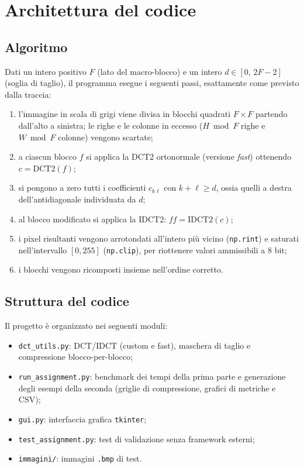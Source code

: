 \documentclass[11pt,a4paper]{article}
\begin{document}
\section{Architettura del codice}\label{sec:arch}

\subsection{Algoritmo}\label{sec:algo}

Dati un intero positivo $F$ (lato del macro-blocco) e un intero
$d\in[0,\,2F-2]$ (soglia di taglio), il programma esegue i seguenti passi,
esattamente come previsto dalla traccia:
\begin{enumerate}
  \item l'immagine in scala di grigi viene divisa in blocchi quadrati $F\times F$
        partendo dall'alto a sinistra; le righe e le colonne in eccesso
        ($H\bmod F$ righe e $W\bmod F$ colonne) vengono scartate;
  \item a ciascun blocco $f$ si applica la DCT2 ortonormale (versione
        \emph{fast}) ottenendo $c = \mathrm{DCT2}(f)$;
  \item si pongono a zero tutti i coefficienti $c_{k\ell}$ con $k+\ell\ge d$,
        ossia quelli a destra dell'antidiagonale individuata da $d$;
  \item al blocco modificato si applica la IDCT2: $ff = \mathrm{IDCT2}(c)$;
  \item i pixel risultanti vengono arrotondati all'intero più vicino
        (\texttt{np.rint}) e saturati nell'intervallo $[0,255]$
        (\texttt{np.clip}), per riottenere valori ammissibili a $8$ bit;
  \item i blocchi vengono ricomposti insieme nell'ordine corretto.
\end{enumerate}

\subsection{Struttura del codice}\label{sec:struttura}

Il progetto è organizzato nei seguenti moduli:
\begin{itemize}
  \item \texttt{dct\_utils.py}: DCT/IDCT (custom e fast), maschera di taglio e
        compressione blocco-per-blocco;
  \item \texttt{run\_assignment.py}: benchmark dei tempi della prima parte e
        generazione degli esempi della seconda (griglie di compressione, grafici
        di metriche e CSV);
  \item \texttt{gui.py}: interfaccia grafica \texttt{tkinter};
  \item \texttt{test\_assignment.py}: test di validazione senza framework
        esterni;
  \item \texttt{immagini/}: immagini \texttt{.bmp} di test.
\end{itemize}
\end{document}
